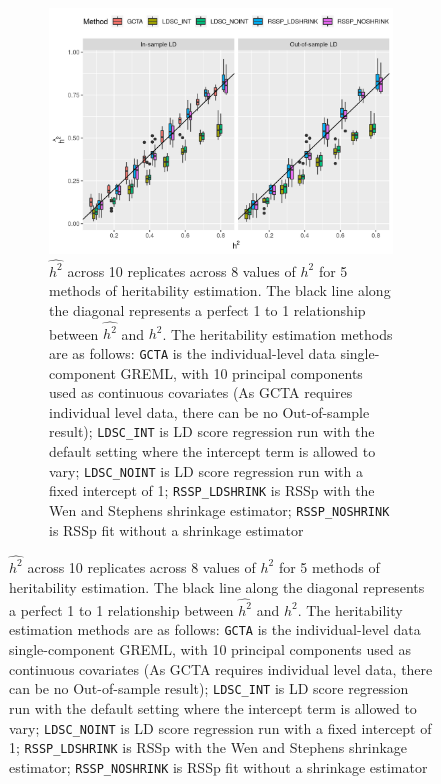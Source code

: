   \begin{figure}
      \centering
  \begin{subfigure}[t]{\textwidth}
    \centering
    \includegraphics[width=.9\linewidth]{img/rssp_v_ldsc_v_gcta.png}
    \caption{$\hat{h^2}$ across 10 replicates across 8 values of $h^2$ for 5 methods of heritability estimation. The black line along the diagonal represents a perfect 1 to 1 relationship between $\hat{h^2}$ and $h^2$.    The heritability estimation methods are as follows: 
    \texttt{GCTA} is the individual-level data single-component GREML, with 10 principal components used as continuous covariates (As GCTA requires individual level data, there can be no Out-of-sample result);
    \texttt{LDSC\_INT} is LD score regression \cite{ldsc} run with the default setting where the intercept term is allowed to vary; 
    \texttt{LDSC\_NOINT} is LD score regression run with a fixed intercept of 1;
    \texttt{RSSP\_LDSHRINK} is RSSp with the Wen and Stephens\cite{Wen_2010} shrinkage estimator; 
    \texttt{RSSP\_NOSHRINK} is RSSp fit without a shrinkage estimator}\label{fig:rssp_method_comparison}
  \end{subfigure}
\end{figure}




